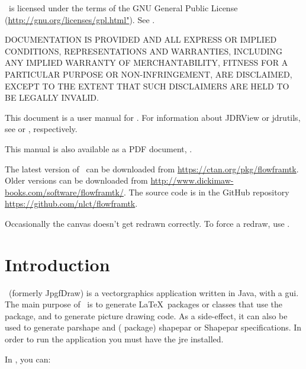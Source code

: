 \FlowframTk\ is licensed under the terms of the GNU General Public License
(\url{http://gnu.org/licenses/gpl.html"}).
See .

DOCUMENTATION IS PROVIDED  AND ALL EXPRESS OR IMPLIED
CONDITIONS, REPRESENTATIONS AND WARRANTIES, INCLUDING ANY
IMPLIED WARRANTY OF MERCHANTABILITY, FITNESS FOR A PARTICULAR
PURPOSE OR NON-INFRINGEMENT, ARE DISCLAIMED, EXCEPT TO THE EXTENT THAT
SUCH DISCLAIMERS ARE HELD TO BE LEGALLY INVALID.

This document is a user manual for \FlowframTk. For information about
JDRView or jdrutils, see  or
, respectively.

\IfTeXParserLib
  {%
    This manual is also available as a PDF document, . 
  }
  {}

The latest version of \FlowframTk\ can be downloaded from
\url{https://ctan.org/pkg/flowframtk}.
Older versions can be downloaded from
\url{http://www.dickimaw-books.com/software/flowframtk/}.
The source code is in the GitHub repository
\url{https://github.com/nlct/flowframtk}.

Occasionally the canvas doesn't get redrawn correctly. To force a
redraw, use .

\frontmatter
\tableofcontents

\mainmatter
\chapter{Introduction}
\label{sec:introduction}

\FlowframTk\ (formerly \gls{JpgfDraw})
is a \gls{vectorgraphics} application written in \gls{Java}, with a 
\gls{gui}.  The main purpose of \FlowframTk\ is to generate \LaTeX\ packages or 
classes that use the  package, and to generate
 picture drawing code. As a side-effect, it can also be
used to generate \gls{parshape} and ( package) \gls{shapepar} or 
\gls{Shapepar} specifications. In order to run the application you 
must have the \gls{jre} installed.

In \FlowframTk, you can:

